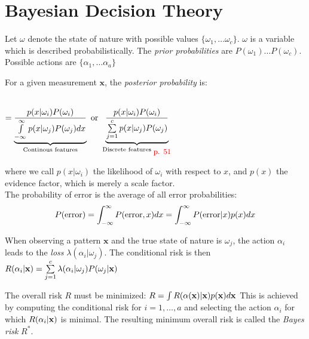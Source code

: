 \section{Bayesian Decision Theory}
\begin{minipage}{9.5cm}
  Let $\omega$ denote the state of nature with possible values $\{\omega_1, \ldots \omega_c\}$.
  $\omega$ is a variable which is described probabilistically.
  The \emph{prior probabilities} are $P(\omega_1) \ldots P(\omega_c)$.
  Possible actions are $\{\alpha_1, \ldots \alpha_a\}$

  For a given measurement $\mathbf{x}$, the \emph{posterior probability} is:
  \begin{center}
     \\
    $= \underbrace{\frac{p(x|\omega_i) P(\omega_i)}{\int\limits_{-\infty}^{\infty}p(x|\omega_j) P(\omega_j) dx}}_{\text{Continous features}}
     \text{ or } 
     \underbrace{\frac{p(x|\omega_i) P(\omega_i)}{\sum\limits_{j=1}^{c}p(x|\omega_j) P(\omega_j)}}_{\text{Discrete features $_{\textcolor{red}{\mbox{\small{p. 51}}}}$}}$
  \end{center}
  
where we call $p(x|\omega_i)$ the likelihood of $\omega_i$ with respect to $x$,
and $p(x)$ the evidence factor, which is merely a scale factor. \\

The probability of error is the average of all error probabilities:
  \begin{align*}
      P(\mathrm{error}) &= \int_{-\infty}^{\infty} P(\mathrm{error}, x) dx = \int_{-\infty}^{\infty} P(\mathrm{error}|x) p(x) dx \\
  \end{align*}


When observing a pattern $\mathbf{x}$ and the true state of nature is $\omega_j$,
the action $\alpha_i$ leads to the \emph{loss} $\lambda(\alpha_i|\omega_j)$.
The conditional risk is then 
$R(\alpha_i|\mathbf{x}) = \sum\limits_{j=1}^c \lambda(\alpha_i|\omega_j)P(\omega_j|\mathbf{x})$

The overall risk $R$ must be minimized:
$R = \int R(\alpha(\mathbf{x})|\mathbf{x})p(\mathbf{x}) d\mathbf{x}$
This is achieved by computing the conditional risk for $i=1,\ldots,a$ 
and selecting the action $\alpha_i$ for which $R(\alpha_i|\mathbf{x})$ is minimal.
The resulting minimum overall risk is called the \emph{Bayes risk} $R^*$.
  
\end{minipage} \vspace{1cm}

